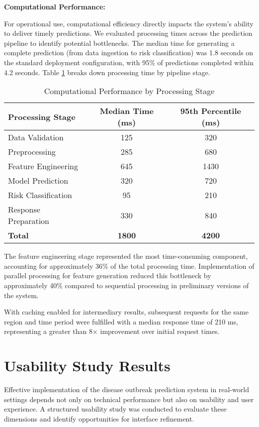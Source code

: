 \documentclass[12pt,a4paper]{report}
\begin{document}
\textbf{Computational Performance:}

For operational use, computational efficiency directly impacts the system's ability to deliver timely predictions. We evaluated processing times across the prediction pipeline to identify potential bottlenecks. The median time for generating a complete prediction (from data ingestion to risk classification) was 1.8 seconds on the standard deployment configuration, with 95\% of predictions completed within 4.2 seconds. Table \ref{tab:computational_perf} breaks down processing time by pipeline stage.

\begin{table}[h]
\centering
\caption{Computational Performance by Processing Stage}
\label{tab:computational_perf}
\begin{tabular}{@{}lcc@{}}
\toprule
\textbf{Processing Stage} & \textbf{Median Time (ms)} & \textbf{95th Percentile (ms)} \\
\midrule
Data Validation & 125 & 320 \\
Preprocessing & 285 & 680 \\
Feature Engineering & 645 & 1430 \\
Model Prediction & 320 & 720 \\
Risk Classification & 95 & 210 \\
Response Preparation & 330 & 840 \\
\midrule
\textbf{Total} & \textbf{1800} & \textbf{4200} \\
\bottomrule
\end{tabular}
\end{table}

The feature engineering stage represented the most time-consuming component, accounting for approximately 36\% of the total processing time. Implementation of parallel processing for feature generation reduced this bottleneck by approximately 40\% compared to sequential processing in preliminary versions of the system.

With caching enabled for intermediary results, subsequent requests for the same region and time period were fulfilled with a median response time of 210 ms, representing a greater than 8× improvement over initial request times.

\section{Usability Study Results}
Effective implementation of the disease outbreak prediction system in real-world settings depends not only on technical performance but also on usability and user experience. A structured usability study was conducted to evaluate these dimensions and identify opportunities for interface refinement.
\end{document}

